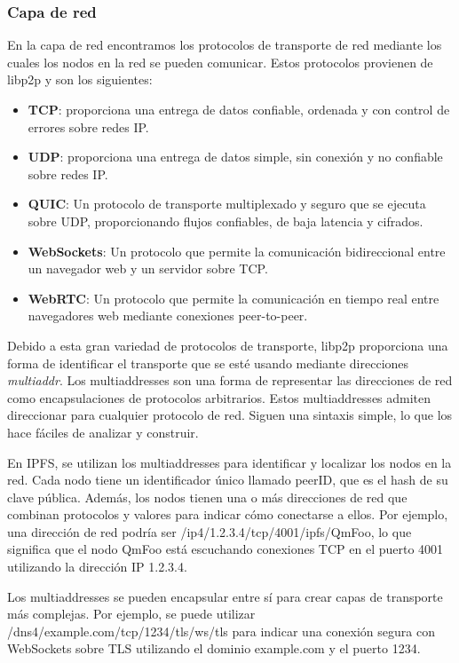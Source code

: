 \subsubsection{Capa de red}
En la capa de red encontramos los protocolos de transporte de red mediante los cuales los nodos en la red se pueden comunicar. Estos protocolos provienen de libp2p\cite{labsLibp2pConnectivity} y son los siguientes:
\begin{itemize}
      \item \textbf{TCP}: proporciona una entrega de datos confiable, ordenada y con control de errores sobre redes IP.
      \item \textbf{UDP}: proporciona una entrega de datos simple, sin conexión y no confiable sobre redes IP.
      \item \textbf{QUIC}: Un protocolo de transporte multiplexado y seguro que se ejecuta sobre UDP, proporcionando flujos confiables, de baja latencia y cifrados.
      \item \textbf{WebSockets}: Un protocolo que permite la comunicación bidireccional entre un navegador web y un servidor sobre TCP.
      \item \textbf{WebRTC}: Un protocolo que permite la comunicación en tiempo real entre navegadores web mediante conexiones peer-to-peer.
\end{itemize}

Debido a esta gran variedad de protocolos de transporte, libp2p proporciona una forma de identificar el transporte que se esté usando mediante
direcciones \textit{multiaddr}.
Los multiaddresses son una forma de representar las direcciones de red como encapsulaciones de protocolos arbitrarios. Estos multiaddresses admiten direccionar
para cualquier protocolo de red. Siguen una sintaxis simple, lo que los hace fáciles de analizar y construir.

En IPFS, se utilizan los multiaddresses para identificar y localizar los nodos en la red. Cada nodo tiene un identificador único llamado peerID, que es el hash de su clave pública. Además, los nodos tienen una o más direcciones de red que combinan protocolos y valores para indicar cómo conectarse a ellos. Por ejemplo, una dirección de red podría ser /ip4/1.2.3.4/tcp/4001/ipfs/QmFoo, lo que significa que el nodo QmFoo está escuchando conexiones TCP en el puerto 4001 utilizando la dirección IP 1.2.3.4.

Los multiaddresses se pueden encapsular entre sí para crear capas de transporte más complejas. Por ejemplo, se puede utilizar /dns4/example.com/tcp/1234/tls/ws/tls para indicar una conexión segura con WebSockets sobre TLS utilizando el dominio example.com y el puerto 1234.

